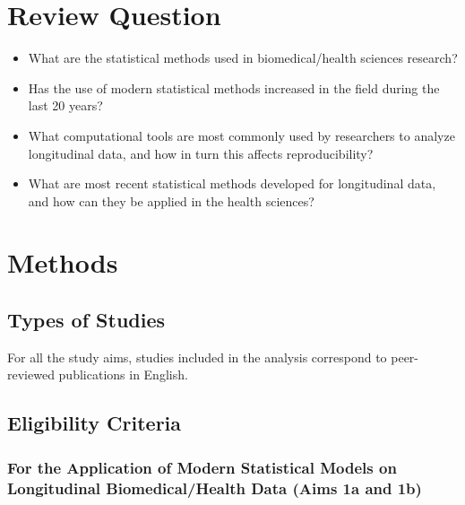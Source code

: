 \documentclass[
]{article}
\begin{document}
\hypertarget{review-question}{%
\section{Review Question}\label{review-question}}

\begin{itemize}
\item
  What are the statistical methods used in biomedical/health sciences
  research?
\item
  Has the use of modern statistical methods increased in the field
  during the last 20 years?
\item
  What computational tools are most commonly used by researchers to
  analyze longitudinal data, and how in turn this affects
  reproducibility?
\item
  What are most recent statistical methods developed for longitudinal
  data, and how can they be applied in the health sciences?
\end{itemize}

\hypertarget{methods}{%
\section{Methods}\label{methods}}

\hypertarget{types-of-studies}{%
\subsection{Types of Studies}\label{types-of-studies}}

For all the study aims, studies included in the analysis correspond to
peer-reviewed publications in English.

\hypertarget{eligibility-criteria}{%
\subsection{Eligibility Criteria}\label{eligibility-criteria}}

\hypertarget{for-the-application-of-modern-statistical-models-on-longitudinal-biomedicalhealth-data-aims-1a-and-1b}{%
\subsubsection{For the Application of Modern Statistical Models on
Longitudinal Biomedical/Health Data (Aims 1a and
1b)}\label{for-the-application-of-modern-statistical-models-on-longitudinal-biomedicalhealth-data-aims-1a-and-1b}}
\end{document}
